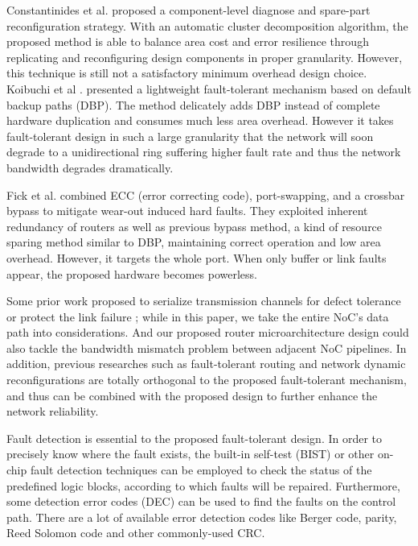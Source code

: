 Constantinides et al. \cite{dumitras2003chip} proposed a component-level diagnose and spare-part reconfiguration strategy. With an automatic cluster decomposition algorithm, the proposed method is able to balance area cost and error resilience through replicating and reconfiguring design components in proper granularity. However, this technique is still not a satisfactory minimum overhead design choice. Koibuchi et al \cite{puente2001adaptive}. presented a lightweight fault-tolerant mechanism based on default backup paths (DBP). The method delicately adds DBP instead of complete hardware duplication and consumes much less area overhead. However it takes fault-tolerant design in such a large granularity that the network will soon degrade to a unidirectional ring suffering higher fault rate and thus the network bandwidth degrades dramatically.

Fick et al. \cite{xiang2011efficient} combined ECC (error correcting code), port-swapping, and a crossbar bypass to mitigate wear-out induced hard faults. They exploited inherent redundancy of routers as well as previous bypass method, a kind of resource sparing method similar to DBP, maintaining correct operation and low area overhead. However, it targets the whole port. When only buffer or link faults appear, the proposed hardware becomes powerless.

Some prior work proposed to serialize transmission channels for defect tolerance \cite{fick2009highly} or protect the link failure \cite{ho2004new} \cite{gomez2006routing}; while in this paper, we take the entire NoC's data path into considerations. And our proposed router microarchitecture design could also tackle the bandwidth mismatch problem between adjacent NoC pipelines. In addition, previous researches such as fault-tolerant routing and network dynamic reconfigurations \cite{dally2004principles} \cite{xiang2011efficient} \cite{fu2011new} \cite{mejia2006segment} are totally orthogonal to the proposed fault-tolerant mechanism, and thus can be combined with the proposed design to further enhance the network reliability.

Fault detection is essential to the proposed fault-tolerant design. In order to precisely know where the fault exists, the built-in self-test (BIST) \cite{wu2003fault} or other on-chip fault detection techniques \cite{flich2008efficient} \cite{rodrigo2010addressing} \cite{feng2012addressing} \cite{li2001loop} can be employed to check the status of the predefined logic blocks, according to which faults will be repaired. Furthermore, some detection error codes (DEC) can be used to find the faults on the control path. There are a lot of available error detection codes like Berger code, parity, Reed Solomon code and other commonly-used CRC.


